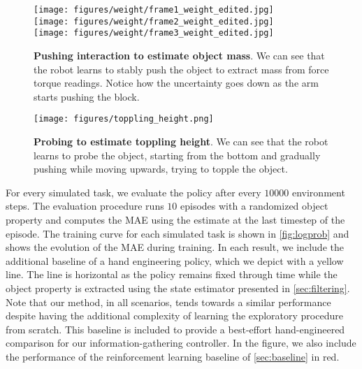 \documentclass[anon]{l4dc2024}
\begin{document}
\begin{figure}[t!]
    \centering
    \begin{minipage}{0.49\textwidth}
        \vspace{-10pt}
        \centering
        \texttt{[image: figures/weight/frame1\_weight\_edited.jpg]} \\
        \texttt{[image: figures/weight/frame2\_weight\_edited.jpg]} \\
        \texttt{[image: figures/weight/frame3\_weight\_edited.jpg]}
        \caption{\vspace{-15pt} \textbf{Pushing interaction to estimate object mass}. We can see that the robot learns to stably push the object to extract mass from force torque readings. Notice how the uncertainty goes down as the arm starts pushing the block.}
        \label{fig:demo_weight}
    \end{minipage}
    \begin{minipage}{0.49\textwidth}
        \centering
        \vspace{-10pt}
        \texttt{[image: figures/toppling\_height.png]} \\
        \caption{\textbf{Probing to estimate toppling height}. We can see that the robot learns to probe the object, starting from the bottom and gradually pushing while moving upwards, trying to topple the object.}
        \label{fig:demo_toppling_height}
    \end{minipage}
\end{figure}

For every simulated task, we evaluate the policy after every  $10000$ environment steps. The evaluation procedure runs $10$ episodes with  a randomized object property and computes the \acf{MAE}  using the estimate at the last timestep of the episode.
The training curve for each simulated task is shown in \autoref{fig:logprob} and shows the evolution of the \ac{MAE} during training.
In each result, we include the additional baseline of a hand engineering policy, which we depict with a yellow  line. The line is horizontal as the policy remains fixed through time while the object property is extracted using the state estimator presented in \autoref{sec:filtering}. Note that our method, in all scenarios, tends towards a similar performance despite having the additional complexity of learning the exploratory procedure from scratch.
This baseline is included to provide a best-effort hand-engineered comparison for our information-gathering controller.
In the figure, we  also include the performance of the reinforcement learning baseline of \autoref{sec:baseline} in red.
\end{document}
